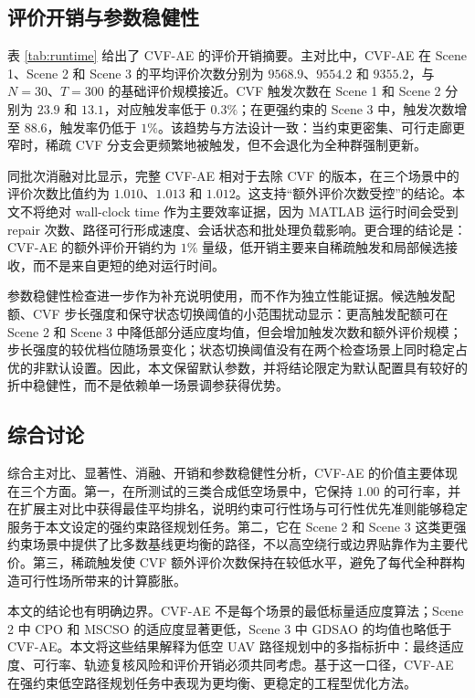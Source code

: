 \subsection{评价开销与参数稳健性}



表 \ref{tab:runtime} 给出了 CVF-AE 的评价开销摘要。主对比中，CVF-AE 在 Scene 1、Scene 2 和 Scene 3 的平均评价次数分别为 $9568.9$、$9554.2$ 和 $9355.2$，与 $N=30$、$T=300$ 的基础评价规模接近。CVF 触发次数在 Scene 1 和 Scene 2 分别为 $23.9$ 和 $13.1$，对应触发率低于 $0.3\%$；在更强约束的 Scene 3 中，触发次数增至 $88.6$，触发率仍低于 $1\%$。该趋势与方法设计一致：当约束更密集、可行走廊更窄时，稀疏 CVF 分支会更频繁地被触发，但不会退化为全种群强制更新。

同批次消融对比显示，完整 CVF-AE 相对于去除 CVF 的版本，在三个场景中的评价次数比值约为 $1.010$、$1.013$ 和 $1.012$。这支持“额外评价次数受控”的结论。本文不将绝对 wall-clock time 作为主要效率证据，因为 MATLAB 运行时间会受到 repair 次数、路径可行形成速度、会话状态和批处理负载影响。更合理的结论是：CVF-AE 的额外评价开销约为 $1\%$ 量级，低开销主要来自稀疏触发和局部候选接收，而不是来自更短的绝对运行时间。

参数稳健性检查进一步作为补充说明使用，而不作为独立性能证据。候选触发配额、CVF 步长强度和保守状态切换阈值的小范围扰动显示：更高触发配额可在 Scene 2 和 Scene 3 中降低部分适应度均值，但会增加触发次数和额外评价规模；步长强度的较优档位随场景变化；状态切换阈值没有在两个检查场景上同时稳定占优的非默认设置。因此，本文保留默认参数，并将结论限定为默认配置具有较好的折中稳健性，而不是依赖单一场景调参获得优势。

\subsection{综合讨论}

综合主对比、显著性、消融、开销和参数稳健性分析，CVF-AE 的价值主要体现在三个方面。第一，在所测试的三类合成低空场景中，它保持 $1.00$ 的可行率，并在扩展主对比中获得最佳平均排名，说明约束可行性场与可行性优先准则能够稳定服务于本文设定的强约束路径规划任务。第二，它在 Scene 2 和 Scene 3 这类更强约束场景中提供了比多数基线更均衡的路径，不以高空绕行或边界贴靠作为主要代价。第三，稀疏触发使 CVF 额外评价次数保持在较低水平，避免了每代全种群构造可行性场所带来的计算膨胀。

本文的结论也有明确边界。CVF-AE 不是每个场景的最低标量适应度算法；Scene 2 中 CPO 和 MSCSO 的适应度显著更低，Scene 3 中 GDSAO 的均值也略低于 CVF-AE。本文将这些结果解释为低空 UAV 路径规划中的多指标折中：最终适应度、可行率、轨迹复核风险和评价开销必须共同考虑。基于这一口径，CVF-AE 在强约束低空路径规划任务中表现为更均衡、更稳定的工程型优化方法。
